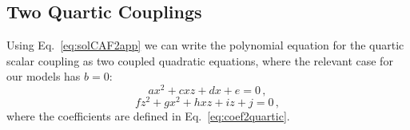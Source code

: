 \subsection{Two Quartic Couplings}\label{sec:appCafadj}
Using Eq.~\eqref{eq:solCAF2app} we can write the polynomial equation for the quartic scalar coupling as two coupled quadratic equations, where the relevant case for our models has $b=0$:
\begin{equation}
    a  {x}^2  + c  {x}{z} + d  {x} + e = 0 \,,   \label{eq:poly1}
\end{equation}
\begin{equation}
   f  {z}^2 + g  {x}^2 + h  {x}{z} + i  {z} + j = 0 \,, \label{eq:poly2}
\end{equation}
where the coefficients are defined in Eq.~\eqref{eq:coef2quartic}.


